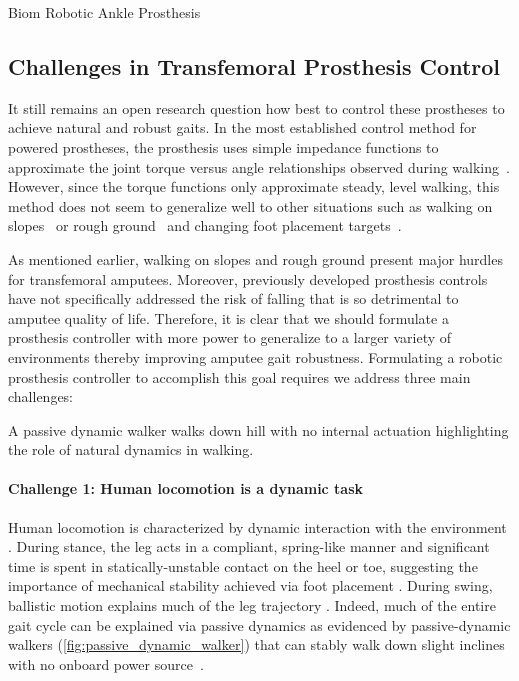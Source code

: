 \begin{marginfigure}[-1in]
    \centering
    \caption{Biom Robotic Ankle Prosthesis}
    \label{fig:biom_ankle}
\end{marginfigure}


\subsection{Challenges in Transfemoral Prosthesis Control}\label{sec:challenges}
It still remains an open research question how best to control these prostheses
to achieve natural and robust gaits. In the most established control method for
powered prostheses, the prosthesis uses simple impedance functions to
approximate the joint torque versus angle relationships observed during
walking~\citep{sup2009preliminary}. However, since the torque functions only
approximate steady, level walking, this method does not seem to generalize well
to other situations such as walking on slopes~\citep{sup2011upslope} or rough
ground~\citep{thatte2016toward} and changing foot placement
targets~\citep{schepelmann2016evaluation}. 

As mentioned earlier, walking on slopes and rough ground present major hurdles
for transfemoral amputees. Moreover, previously developed prosthesis controls
have not specifically addressed the risk of falling that is so detrimental to
amputee quality of life. Therefore, it is clear that we should formulate a
prosthesis controller with more power to generalize to a larger variety of
environments thereby improving amputee gait robustness. Formulating a robotic
prosthesis controller to accomplish this goal requires we address three main
challenges:

\begin{marginfigure}
    \centering
    \caption{A passive dynamic walker walks down hill with no internal
    actuation highlighting the role of natural dynamics in walking.}
    \label{fig:passive_dynamic_walker}
\end{marginfigure}

\paragraph{Challenge 1: Human locomotion is a dynamic task}
Human locomotion is characterized by dynamic interaction with the
environment \citep{mcgeer_1992}. During stance, the leg acts in a compliant,
spring-like manner \citep{geyer2006compliant} and significant time is spent
in statically-unstable contact on the heel or toe, suggesting the importance
of mechanical stability achieved via foot placement \citep{perry1992gait}.
During swing, ballistic motion explains much of the leg trajectory
\citep{mochon1980ballistic}. Indeed, much of the entire gait cycle can be
explained via passive dynamics as evidenced by passive-dynamic walkers
(\cref{fig:passive_dynamic_walker}) that can stably walk down slight
inclines with no onboard power source~\citep{mcgeer1990passive,
collins2005efficient}.

